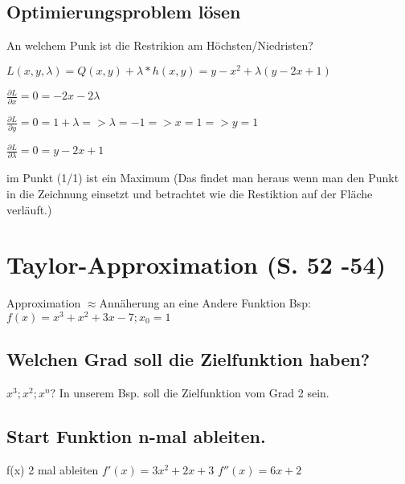 \documentclass[a4paper, 11pt]{article}
\begin{document}
\subsection{Optimierungsproblem lösen}

An welchem Punk ist die Restrikion am Höchsten/Niedristen? \newline

$L(x,y,\lambda) = Q(x,y) + \lambda * h(x,y) = y-x^2+\lambda(y-2x+1)$ \newline

\begin{compactenum}[(1)] 
\item $\frac{\partial L}{\partial x} = 0 = -2x-2\lambda$ 
\item $\frac{\partial L}{\partial y} = 0 = 1 + \lambda => \lambda = -1 => x = 1
	=> y = 1$
\item $\frac{\partial L}{\partial \lambda} = 0 = y-2x+1$ \newline
\end{compactenum}

im Punkt (1/1) ist ein Maximum \newline
\newline (Das findet man heraus wenn man den Punkt in die Zeichnung einsetzt und betrachtet wie die Restiktion auf der Fläche verläuft.)

\section { Taylor-Approximation (S. 52 -54)}

Approximation $\approx $Annäherung an eine Andere Funktion \newline 
\newline Bsp: $f(x) = x^3 + x^2 + 3x - 7 ; x_0 = 1$ 	

\subsection {Welchen Grad soll die Zielfunktion haben?}

$x^3; x^2; x^n ?$\newline
\newline In unserem Bsp. soll die Zielfunktion vom Grad 2 sein.


\subsection {Start Funktion n-mal ableiten.}

f(x) 2 mal ableiten\newline
\newline
$f'(x) = 3x^2 + 2x + 3$\newline
$f''(x) = 6x + 2$
\end{document}
